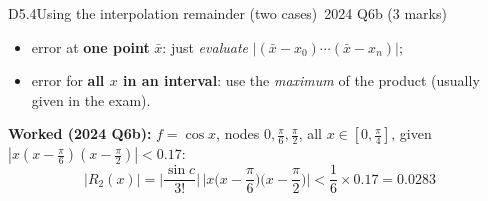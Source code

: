 \begin{deriv}{D5.4}{Using the interpolation remainder (two cases)}{\stwo\ 2024 Q6b (3 marks)}
\begin{itemize}[leftmargin=18pt,itemsep=1pt]
\item error at \textbf{one point} $\bar x$: just \emph{evaluate} $|(\bar x-x_0)\cdots(\bar x-x_n)|$;
\item error for \textbf{all $x$ in an interval}: use the \emph{maximum} of the product (usually given in the exam).
\end{itemize}

\textbf{Worked (2024 Q6b):} $f=\cos x$, nodes $0,\frac\pi6,\frac\pi2$, all $x\in[0,\frac\pi4]$, given $|x(x-\frac\pi6)(x-\frac\pi2)|<0.17$:
\[|R_2(x)|=\Big|\frac{\sin c}{3!}\Big|\,\Big|x\Big(x-\frac\pi6\Big)\Big(x-\frac\pi2\Big)\Big|<\frac{1}{6}\times0.17=0.0283\]
\end{deriv}

